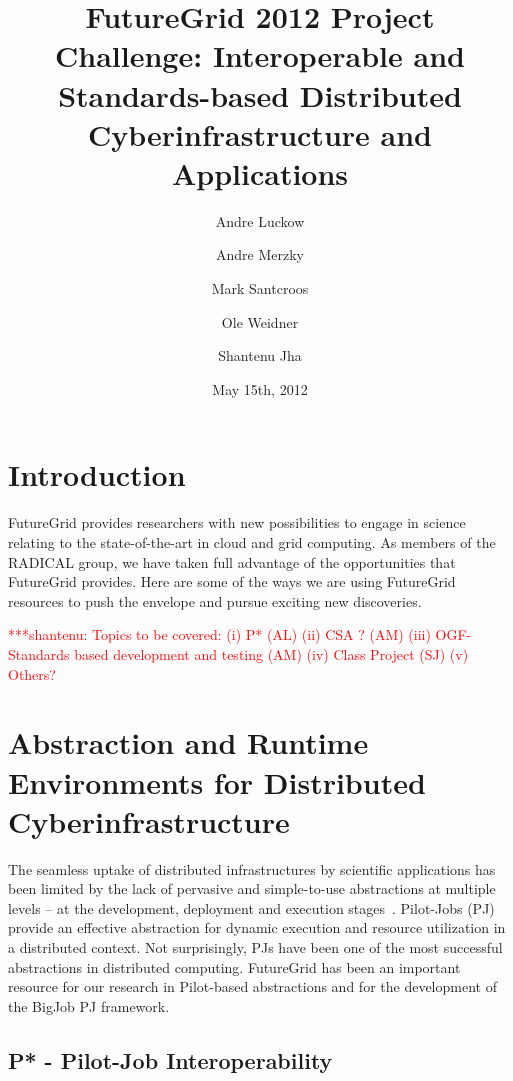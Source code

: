 \documentclass[]{paper}
\newcommand{\jhanote}[1]{ {\textcolor{red} { ***shantenu: #1 }}}
\newcommand{\jhanote}[1]{}
\begin{document}
\title{FutureGrid 2012 Project Challenge: Interoperable and
  Standards-based Distributed Cyberinfrastructure and Applications}
 
\author{Andre Luckow 
  \and Andre Merzky
  \and Mark Santcroos
  \and Ole Weidner 
  \and Shantenu Jha
}
\date{May 15th, 2012}
\maketitle

\begin{abstract}
\end{abstract}

\section{Introduction}

FutureGrid provides researchers with new possibilities to engage in
science relating to the state-of-the-art in cloud and grid
computing. As members of the RADICAL group, we have taken full
advantage of the opportunities that FutureGrid provides. Here are some
of the ways we are using FutureGrid resources to push the envelope and
pursue exciting new discoveries.

\jhanote{Topics to be covered: (i) P* (AL) (ii) CSA ? (AM) (iii)
  OGF-Standards based development and testing (AM) (iv) Class Project
  (SJ) (v) Others?}


\section{Abstraction and Runtime Environments for Distributed Cyberinfrastructure}

The seamless uptake of distributed infrastructures by scientific applications
has been limited by the lack of pervasive and simple-to-use abstractions at
multiple levels -- at the development, deployment and execution
stages~\cite{dpagrid2009}. Pilot-Jobs (PJ) provide an effective abstraction for
dynamic execution and resource utilization in a distributed context. Not
surprisingly, PJs have been one of the most successful abstractions in
distributed computing. FutureGrid has been an important resource for our
research in Pilot-based abstractions and for the development of the BigJob PJ
framework\cite{saga_bigjob_condor_cloud}.


\subsection{P* - Pilot-Job Interoperability}
\end{document}
